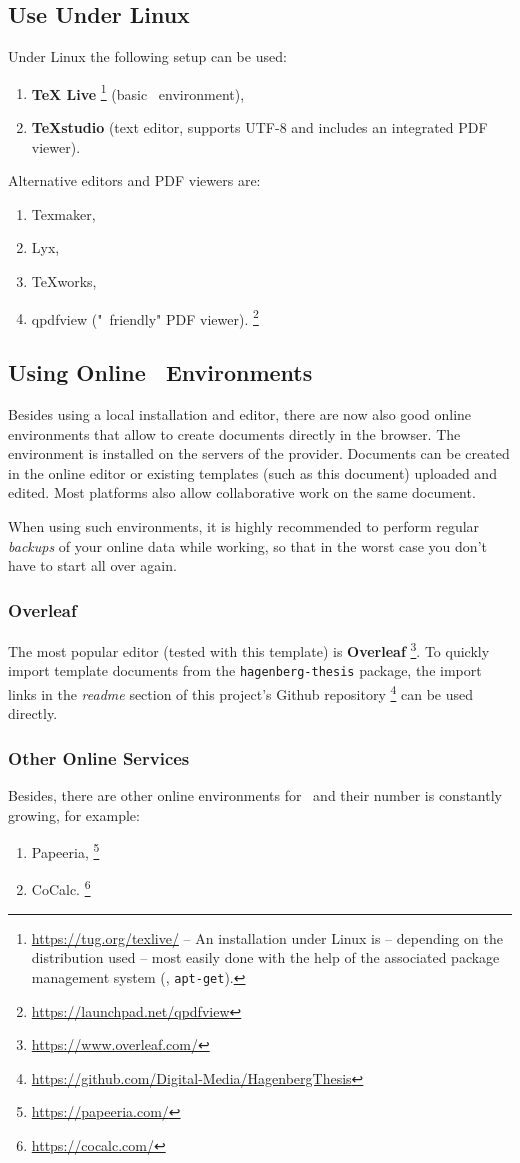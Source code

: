 \subsection{Use Under Linux}

Under Linux the following setup can be used:
%
\begin{enumerate}
	\item 
	\textbf{TeX Live}%
	\footnote{\url{https://tug.org/texlive/} -- An installation under Linux is -- depending
	on the distribution used -- most easily done with the help of the associated package
	management system (\eg, \texttt{apt-get}).}
	(basic \latex\ environment),
	\item \textbf{TeXstudio} (text editor, supports UTF-8 and includes an
	integrated PDF viewer).
\end{enumerate}
%
Alternative editors and PDF viewers are:
%
\begin{enumerate}
	\item Texmaker,%
	\item Lyx,%
	\item TeXworks,%
	\item qpdfview ("\latex\ friendly" PDF viewer).%
	\footnote{\url{https://launchpad.net/qpdfview}}
\end{enumerate}


\subsection{Using Online \latex\ Environments}

Besides using a local \latex installation and editor, there are now also good online 
environments that allow to create \latex documents directly in the browser.
The \latex environment is installed on the servers of the provider. Documents can be
created in the online editor or existing templates (such as this document) uploaded and 
edited. Most platforms also allow collaborative work on the same document.

When using such environments, it is highly recommended to perform regular \emph{backups} of your
online data while working, so that in the worst case you don't have to start all over 
again.

\subsubsection{Overleaf}

The most popular editor (tested with this template) is \textbf{Overleaf}%
\footnote{\url{https://www.overleaf.com/}}.
To quickly import template documents from the \texttt{hagenberg-thesis} package, the 
import links in the \emph{readme} section of this project's Github repository%
\footnote{\url{https://github.com/Digital-Media/HagenbergThesis}}
can be used directly.


\subsubsection{Other Online Services}

Besides, there are other online environments for \latex\ and their number is constantly growing, for example:
%
\begin{enumerate}
	\item Papeeria,%
	\footnote{\url{https://papeeria.com/}}
	\item CoCalc.%
	\footnote{\url{https://cocalc.com/}}
\end{enumerate}
